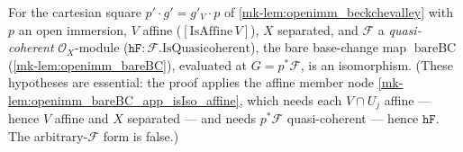 \begin{lemma}\label{mk-lem:openimm_bareBC_isIso}
  \leanok

  For the cartesian square \(p' \cdot g' = g'_V \cdot p\) of \ref{mk-lem:openimm_beckchevalley} with
  \(p\) an open immersion, \(V\) affine (\([\mathrm{IsAffine}\,V]\)), \(X\) separated, and
  \(\mathcal{F}\) a \emph{quasi-coherent} \(\mathcal{O}_X\)-module
  (\(\mathtt{hF} : \mathcal{F}.\mathrm{IsQuasicoherent}\)), the bare base-change map
  \(\operatorname{bareBC}\) (\ref{mk-lem:openimm_bareBC}), evaluated at \(G = p^*\mathcal{F}\), is an
  isomorphism. (These hypotheses are essential: the proof applies the affine member node
  \ref{mk-lem:openimm_bareBC_app_isIso_affine}, which needs each \(V \cap U_j\) affine ---
  hence \(V\) affine and \(X\) separated --- and needs \(p^*\mathcal{F}\) quasi-coherent ---
  hence \(\mathtt{hF}\). The arbitrary-\(\mathcal{F}\) form is false.)
\end{lemma}
